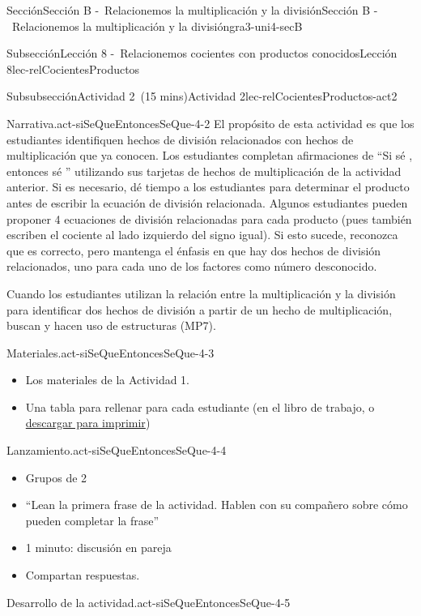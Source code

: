 \documentclass[oneside,10pt,]{article}
\begin{document}
\begin{sectionptx}{Sección}{Sección B -~Relacionemos la multiplicación y la división}{}{Sección B -~Relacionemos la multiplicación y la división}{}{}{gra3-uni4-secB}
\begin{subsectionptx}{Subsección}{Lección 8 -~Relacionemos cocientes con productos conocidos}{}{Lección 8}{}{}{lec-relCocientesProductos}
\begin{subsubsectionptx}{Subsubsección}{Actividad 2~(15 mins)}{}{Actividad 2}{}{}{lec-relCocientesProductos-act2}
\begin{paragraphs}{Narrativa.}{act-siSeQueEntoncesSeQue-4-2}
El propósito de esta actividad es que los estudiantes identifiquen hechos de división relacionados con hechos de multiplicación que ya conocen. Los estudiantes completan afirmaciones de ``Si sé \textunderscore{}\textunderscore{}\textunderscore{}, entonces sé \textunderscore{}\textunderscore{}\textunderscore{}'' utilizando sus tarjetas de hechos de multiplicación de la actividad anterior. Si es necesario, dé tiempo a los estudiantes para determinar el producto antes de escribir la ecuación de división relacionada. Algunos estudiantes pueden proponer 4 ecuaciones de división relacionadas para cada producto (pues también escriben el cociente al lado izquierdo del signo igual). Si esto sucede, reconozca que es correcto, pero mantenga el énfasis en que hay dos hechos de división relacionados, uno para cada uno de los factores como número desconocido.%
\par
Cuando los estudiantes utilizan la relación entre la multiplicación y la división para identificar dos hechos de división a partir de un hecho de multiplicación, buscan y hacen uso de estructuras (MP7).%
\end{paragraphs}%
\begin{paragraphs}{Materiales.}{act-siSeQueEntoncesSeQue-4-3}%
%
\begin{itemize}[label=\textbullet]
\item{}Los materiales de la Actividad 1.%
\item{}Una tabla para rellenar para cada estudiante (en el libro de trabajo, o \href{external/act-pdf/act-siSeQueEntoncesSeQue.pdf}{descargar para imprimir}\footnotemark{})%
\end{itemize}
\end{paragraphs}%
\begin{paragraphs}{Lanzamiento.}{act-siSeQueEntoncesSeQue-4-4}%
%
\begin{itemize}[label=\textbullet]
\item{}Grupos de 2%
\item{}``Lean la primera frase de la actividad. Hablen con su compañero sobre cómo pueden completar la frase''%
\item{}1 minuto: discusión en pareja%
\item{}Compartan respuestas.%
\end{itemize}
\end{paragraphs}%
\begin{paragraphs}{Desarrollo de la actividad.}{act-siSeQueEntoncesSeQue-4-5}%
%
\begin{itemize}[label=\textbullet]

\end{itemize}
\end{paragraphs}
\end{subsubsectionptx}
\end{subsectionptx}
\end{sectionptx}
\end{document}
